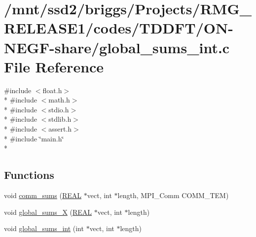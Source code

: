 \hypertarget{_t_d_d_f_t_2_o_n-_n_e_g_f-share_2global__sums__int_8c}{\section{/mnt/ssd2/briggs/\-Projects/\-R\-M\-G\-\_\-\-R\-E\-L\-E\-A\-S\-E1/codes/\-T\-D\-D\-F\-T/\-O\-N-\/\-N\-E\-G\-F-\/share/global\-\_\-sums\-\_\-int.c File Reference}
\label{_t_d_d_f_t_2_o_n-_n_e_g_f-share_2global__sums__int_8c}
}
{\ttfamily \#include $<$float.\-h$>$}\\*
{\ttfamily \#include $<$math.\-h$>$}\\*
{\ttfamily \#include $<$stdio.\-h$>$}\\*
{\ttfamily \#include $<$stdlib.\-h$>$}\\*
{\ttfamily \#include $<$assert.\-h$>$}\\*
{\ttfamily \#include \char`\"{}main.\-h\char`\"{}}\\*
\subsection*{Functions}
\begin{DoxyCompactItemize}
\item 
void \hyperlink{_t_d_d_f_t_2_o_n-_n_e_g_f-share_2global__sums__int_8c_aa9dde1956c60d45d95ce4903cb9a329a}{comm\-\_\-sums} (\hyperlink{md_8h_a4b654506f18b8bfd61ad2a29a7e38c25}{R\-E\-A\-L} $\ast$vect, int $\ast$length, M\-P\-I\-\_\-\-Comm C\-O\-M\-M\-\_\-\-T\-E\-M)
\item 
void \hyperlink{_t_d_d_f_t_2_o_n-_n_e_g_f-share_2global__sums__int_8c_a2d31c1b4a394254a7b0a3b08727368d7}{global\-\_\-sums\-\_\-\-X} (\hyperlink{md_8h_a4b654506f18b8bfd61ad2a29a7e38c25}{R\-E\-A\-L} $\ast$vect, int $\ast$length)
\item 
void \hyperlink{_t_d_d_f_t_2_o_n-_n_e_g_f-share_2global__sums__int_8c_a56b65ee5edf5997e05e99457e35ec546}{global\-\_\-sums\-\_\-int} (int $\ast$vect, int $\ast$length)
\end{DoxyCompactItemize}


